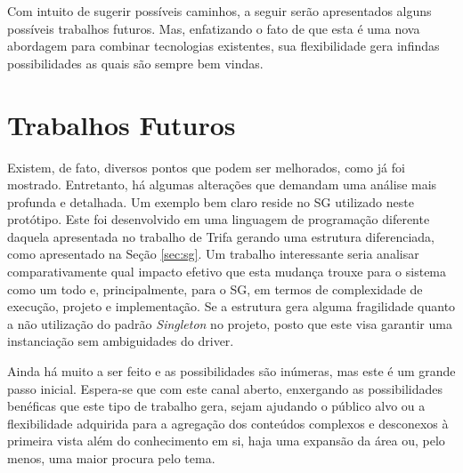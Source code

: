 \documentclass[12pt,a4paper,oneside]{report}
\begin{document}
Com intuito de sugerir possíveis caminhos, a seguir serão apresentados alguns possíveis trabalhos futuros. Mas, enfatizando o fato de que esta é uma nova abordagem para combinar tecnologias existentes, sua flexibilidade gera infindas possibilidades as quais são sempre bem vindas.

\section{Trabalhos Futuros}

Existem, de fato, diversos pontos que podem ser melhorados, como já foi mostrado. Entretanto, há algumas alterações que demandam uma análise mais profunda e detalhada. Um exemplo bem claro reside no SG utilizado neste protótipo. Este foi desenvolvido em uma linguagem de programação diferente daquela apresentada no trabalho de Trifa\cite{sgtriwiguiboh} gerando uma estrutura diferenciada, como apresentado na Seção \ref{sec:sg}. Um trabalho interessante seria analisar comparativamente qual impacto efetivo que esta mudança trouxe para o sistema como um todo e, principalmente, para o SG, em termos de complexidade de execução, projeto e implementação. Se a estrutura gera alguma fragilidade quanto a não utilização do padrão \emph{Singleton} no projeto, posto que este visa garantir uma instanciação sem ambiguidades do driver.

Ainda há muito a ser feito e as possibilidades são inúmeras, mas este é um grande passo inicial. Espera-se que com este canal aberto, enxergando as possibilidades benéficas que este tipo de trabalho gera, sejam ajudando o público alvo ou a flexibilidade adquirida para a agregação dos conteúdos complexos e desconexos à primeira vista além do conhecimento em si, haja uma expansão da área ou, pelo menos, uma maior procura pelo tema.



\cleardoublepage
{}
\end{document}

